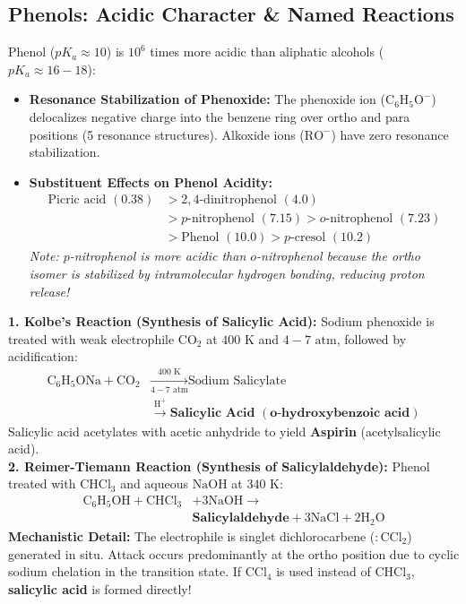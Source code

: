 \documentclass[10pt,twoside,openright]{book}
\begin{document}
\subsection{Phenols: Acidic Character \& Named Reactions}

\begin{conceptbox}
Phenol ($pK_a \approx 10$) is $10^6$ times more acidic than aliphatic alcohols ($pK_a \approx 16-18$):
\begin{itemize}
  \item \textbf{Resonance Stabilization of Phenoxide:} The phenoxide ion ($\mathrm{C_6H_5O^-}$) delocalizes negative charge into the benzene ring over ortho and para positions (5 resonance structures). Alkoxide ions ($\mathrm{RO^-}$) have zero resonance stabilization.
  \item \textbf{Substituent Effects on Phenol Acidity:}
  \begin{align}
    \text{Picric acid } (0.38) &> 2,4\text{-dinitrophenol } (4.0) \\
    &> p\text{-nitrophenol } (7.15) > o\text{-nitrophenol } (7.23) \\
    &> \text{Phenol } (10.0) > p\text{-cresol } (10.2)
  \end{align}
  \textit{Note: $p$-nitrophenol is more acidic than $o$-nitrophenol because the ortho isomer is stabilized by intramolecular hydrogen bonding, reducing proton release!}
\end{itemize}
\end{conceptbox}

\begin{formulabox}
\textbf{1. Kolbe's Reaction (Synthesis of Salicylic Acid):}
Sodium phenoxide is treated with weak electrophile $\mathrm{CO_2}$ at $400\text{ K}$ and $4-7\text{ atm}$, followed by acidification:
\begin{align}
  \mathrm{C_6H_5ONa} + \mathrm{CO_2} &\xrightarrow[4-7\text{ atm}]{400\text{ K}} \text{Sodium Salicylate} \\
  &\xrightarrow{\mathrm{H^+}} \mathbf{\text{Salicylic Acid } (o\text{-hydroxybenzoic acid})}
\end{align}
Salicylic acid acetylates with acetic anhydride to yield \textbf{Aspirin} (acetylsalicylic acid).\\
\textbf{2. Reimer-Tiemann Reaction (Synthesis of Salicylaldehyde):}
Phenol treated with $\mathrm{CHCl_3}$ and aqueous $\mathrm{NaOH}$ at $340\text{ K}$:
\begin{align}
  \mathrm{C_6H_5OH} + \mathrm{CHCl_3} &+ 3\mathrm{NaOH} \longrightarrow \\
  &\mathbf{\text{Salicylaldehyde}} + 3\mathrm{NaCl} + 2\mathrm{H_2O}
\end{align}
\textbf{Mechanistic Detail:} The electrophile is singlet dichlorocarbene ($:\mathrm{CCl_2}$) generated in situ. Attack occurs predominantly at the ortho position due to cyclic sodium chelation in the transition state. If $\mathrm{CCl_4}$ is used instead of $\mathrm{CHCl_3}$, \textbf{salicylic acid} is formed directly!
\end{formulabox}
\end{document}
